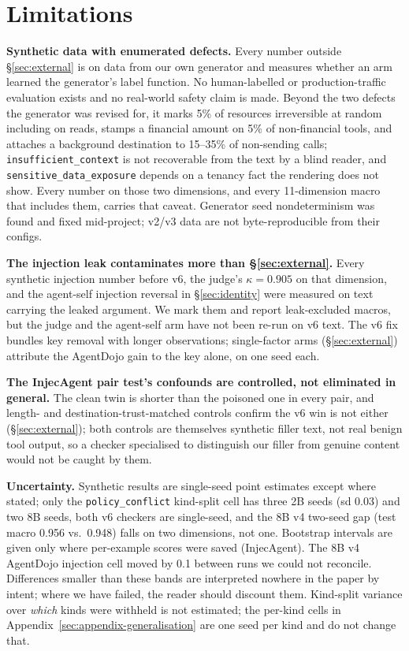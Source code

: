 \section*{Limitations}
\label{sec:limitations}

\textbf{Synthetic data with enumerated defects.} Every number outside
\S\ref{sec:external} is on data from our own generator and measures whether
an arm learned the generator's label function. No human-labelled or
production-traffic evaluation exists and no real-world safety claim is made.
Beyond the two defects the generator was revised for, it marks 5\% of
resources irreversible at random including on reads, stamps a financial
amount on 5\% of non-financial tools, and attaches a background destination
to 15--35\% of non-sending calls; \texttt{insufficient\_context} is not
recoverable from the text by a blind reader, and \texttt{sensitive\_data\_exposure}
depends on a tenancy fact the rendering does not show. Every number on those
two dimensions, and every 11-dimension macro that includes them, carries that
caveat. Generator seed nondeterminism was found and fixed mid-project; v2/v3
data are not byte-reproducible from their configs.

\textbf{The injection leak contaminates more than \S\ref{sec:external}.}
Every synthetic injection number before v6, the judge's $\kappa{=}0.905$ on
that dimension, and the agent-self injection reversal in
\S\ref{sec:identity} were measured on text carrying the leaked argument.
We mark them and report leak-excluded macros, but the judge and the
agent-self arm have not been re-run on v6 text. The v6 fix bundles key
removal with longer observations; single-factor arms (\S\ref{sec:external})
attribute the AgentDojo gain to the key alone, on one seed each.

\textbf{The InjecAgent pair test's confounds are controlled, not eliminated
in general.} The clean twin is shorter than the poisoned one in every pair,
and length- and destination-trust-matched controls confirm the v6 win is not
either (\S\ref{sec:external}); both controls are themselves synthetic filler
text, not real benign tool output, so a checker specialised to distinguish
our filler from genuine content would not be caught by them.

\textbf{Uncertainty.} Synthetic results are single-seed point estimates
except where stated; only the \texttt{policy\_conflict} kind-split cell has
three 2B seeds (sd 0.03) and two 8B seeds, both v6 checkers are single-seed,
and the 8B v4 two-seed gap (test macro 0.956 vs.\ 0.948) falls on two
dimensions, not one. Bootstrap intervals are given only where per-example
scores were saved (InjecAgent). The 8B v4 AgentDojo injection cell moved by
0.1 between runs we could not reconcile. Differences smaller than these
bands are interpreted nowhere in the paper by intent; where we have failed,
the reader should discount them. Kind-split variance over \emph{which} kinds
were withheld is not estimated; the per-kind cells in
Appendix~\ref{sec:appendix-generalisation} are one seed per kind and do not
change that.

